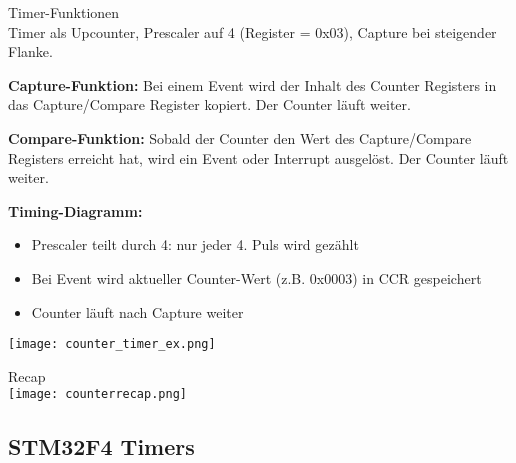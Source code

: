 \begin{example2}{Timer-Funktionen}\\
    Timer als Upcounter, Prescaler auf 4 (Register = 0x03), Capture bei steigender Flanke.
    
    \tcblower
    
    \textbf{Capture-Funktion:}
    Bei einem Event wird der Inhalt des Counter Registers in das Capture/Compare Register kopiert. Der Counter läuft weiter.
    
    \textbf{Compare-Funktion:}
    Sobald der Counter den Wert des Capture/Compare Registers erreicht hat, wird ein Event oder Interrupt ausgelöst. Der Counter läuft weiter.
    
    \textbf{Timing-Diagramm:}
    \begin{itemize}
        \item Prescaler teilt durch 4: nur jeder 4. Puls wird gezählt
        \item Bei Event wird aktueller Counter-Wert (z.B. 0x0003) in CCR gespeichert
        \item Counter läuft nach Capture weiter
    \end{itemize}
    \texttt{[image: counter\_timer\_ex.png]}
\end{example2}


\begin{example2}{Recap}\\
    \texttt{[image: counterrecap.png]}
\end{example2}

\raggedcolumns
\pagebreak

\subsection{STM32F4 Timers}



